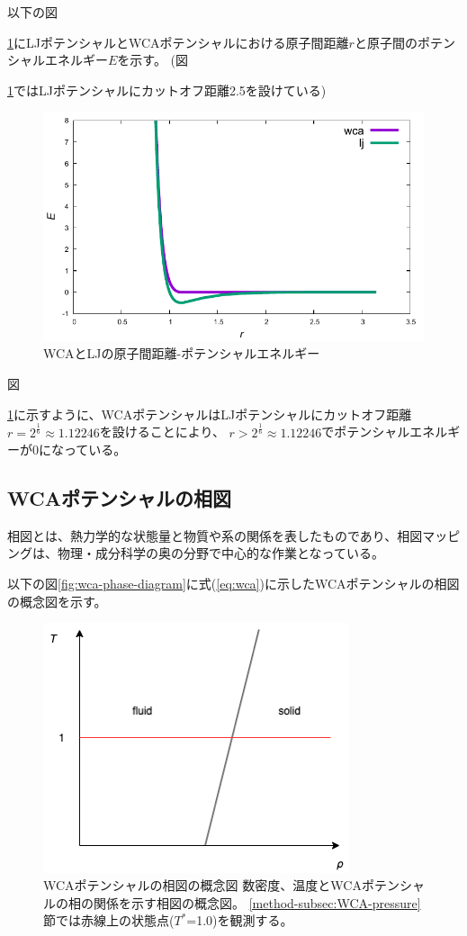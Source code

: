 \documentclass[titlepage]{jsreport}
\begin{document}
以下の図{\ref{fig:dis-poen}にLJポテンシャルとWCAポテンシャルにおける原子間距離$r$と原子間のポテンシャルエネルギー$E$を示す。
(図{\ref{fig:dis-poen}ではLJポテンシャルにカットオフ距離2.5を設けている)

\begin{figure}[htbp]
    \begin{center}
        \includegraphics[width=13cm]{fig/dis-poen.pdf}
    \end{center}
    \caption{WCAとLJの原子間距離-ポテンシャルエネルギー}
    \label{fig:dis-poen}
\end{figure}
図{\ref{fig:dis-poen}に示すように、WCAポテンシャルはLJポテンシャルにカットオフ距離$r=2^{\frac{1}{6}}{\approx}1.12246$を設けることにより、
$r>2^{\frac{1}{6}}{\approx}1.12246$でポテンシャルエネルギーが0になっている。


\newpage
\subsection{WCAポテンシャルの相図}\label{method-subsec:WCA-phase}
相図とは、熱力学的な状態量と物質や系の関係を表したものであり、相図マッピングは、物理・成分科学の奥の分野で中心的な作業となっている\cite{phase-diagram}。

以下の図\ref{fig:wca-phase-diagram}に式(\ref{eq:wca})に示したWCAポテンシャルの相図の概念図を示す。

\begin{figure}[htbp]
    \begin{center}
        \includegraphics[width=9cm]{fig/wca-phase-diagram.png}
    \end{center}
    \caption{WCAポテンシャルの相図の概念図
    数密度、温度とWCAポテンシャルの相の関係を示す相図の概念図。
    \ref{method-subsec:WCA-pressure}節では赤線上の状態点($T^*$=1.0)を観測する。}
    

\end{figure}}}}
\end{document}
